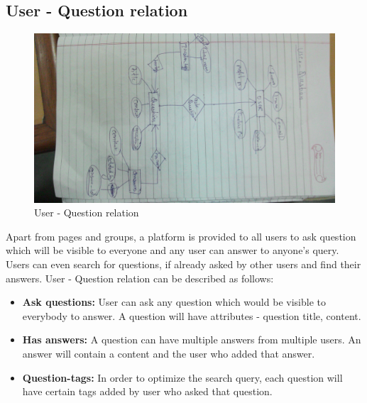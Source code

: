 \documentclass{article}
\begin{document}
\subsection{User - Question relation}
\begin{figure}[h]
\centering
\includegraphics[scale=0.2]{fig4.jpg}
\caption{User - Question relation}
\label{fig4}
\end{figure}
Apart from pages and groups, a platform is provided to all users to ask question which will be visible to everyone and any user can answer to anyone's query. Users can even search for questions, if already asked by other users and find their answers. User - Question relation can be described as follows:
\begin{itemize}
\item \textbf{Ask questions:} User can ask any question which would be visible to everybody to answer. A question will have attributes - question title, content.
\item \textbf{Has answers:} A question can have multiple answers from multiple users. An answer will contain a content and the user who added that answer.
\item \textbf{Question-tags:} In order to optimize the search query, each question will have certain tags added by user who asked that question. 
\end{itemize} 
\end{document}
